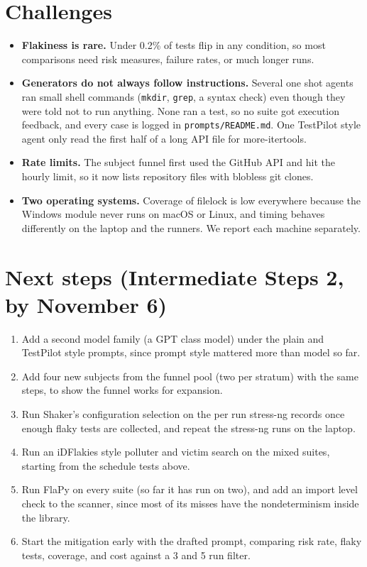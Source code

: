 \documentclass[sigconf,nonacm]{acmart}
\begin{document}
\section{Challenges}
\begin{itemize}
\item \textbf{Flakiness is rare.} Under 0.2\% of tests flip in any condition, so most comparisons need risk measures, failure rates, or much longer runs.
\item \textbf{Generators do not always follow instructions.} Several one shot agents ran small shell commands (\texttt{mkdir}, \texttt{grep}, a syntax check) even though they were told not to run anything. None ran a test, so no suite got execution feedback, and every case is logged in \texttt{prompts/README.md}. One TestPilot style agent only read the first half of a long API file for more-itertools.
\item \textbf{Rate limits.} The subject funnel first used the GitHub API and hit the hourly limit, so it now lists repository files with blobless git clones.
\item \textbf{Two operating systems.} Coverage of filelock is low everywhere because the Windows module never runs on macOS or Linux, and timing behaves differently on the laptop and the runners. We report each machine separately.
\end{itemize}

\section{Next steps (Intermediate Steps 2, by November 6)}
\begin{enumerate}
\item Add a second model family (a GPT class model) under the plain and TestPilot style prompts, since prompt style mattered more than model so far.
\item Add four new subjects from the funnel pool (two per stratum) with the same steps, to show the funnel works for expansion.
\item Run Shaker's configuration selection on the per run stress-ng records once enough flaky tests are collected, and repeat the stress-ng runs on the laptop.
\item Run an iDFlakies style polluter and victim search on the mixed suites, starting from the schedule tests above.
\item Run FlaPy on every suite (so far it has run on two), and add an import level check to the scanner, since most of its misses have the nondeterminism inside the library.
\item Start the mitigation early with the drafted prompt, comparing risk rate, flaky tests, coverage, and cost against a 3 and 5 run filter.
\end{enumerate}
\end{document}
